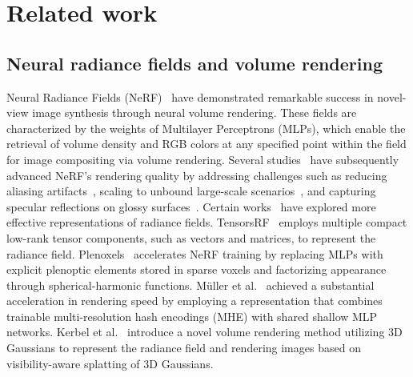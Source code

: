 \section{Related work}
\subsection{Neural radiance fields and volume rendering} %


Neural Radiance Fields (NeRF)~\cite{mildenhall2020nerf} have demonstrated remarkable success in novel-view image synthesis through neural volume rendering. These fields are characterized by the weights of Multilayer Perceptrons (MLPs), which enable the retrieval of volume density and RGB colors at any specified point within the field for image compositing via volume rendering. Several studies~\cite{barron2021mip,barron2022mip,verbin2022ref,chen2022tensorf,fridovich2022plenoxels} have subsequently advanced NeRF's rendering quality by addressing challenges such as reducing aliasing artifacts~\cite{barron2021mip}, scaling to unbound large-scale scenarios~\cite{barron2022mip}, and capturing specular reflections on glossy surfaces~\cite{verbin2022ref}.
Certain works~\cite{chen2022tensorf,fridovich2022plenoxels,mueller2022instant,kerbl20233d} have explored more effective representations of radiance fields. TensorsRF~\cite{chen2022tensorf} employs multiple compact low-rank tensor components, such as vectors and matrices, to represent the radiance field. Plenoxels~\cite{fridovich2022plenoxels} accelerates NeRF training by replacing MLPs with explicit plenoptic elements stored in sparse voxels and factorizing appearance through spherical-harmonic functions.
M\"uller et al.~\cite{mueller2022instant} achieved a substantial acceleration in rendering speed by employing a representation that combines trainable multi-resolution hash encodings (MHE) with shared shallow MLP networks. Kerbel et al.~\cite{kerbl20233d} introduce a novel volume rendering method utilizing 3D Gaussians to represent the radiance field and rendering images based on visibility-aware splatting of 3D Gaussians.


